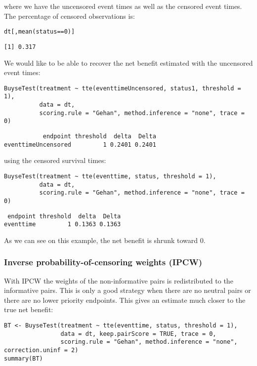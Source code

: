 \documentclass[12pt]{article}
\begin{document}
where we have the uncensored event times as well as the censored event
times. The percentage of censored observations is:
\lstset{language=r,label= ,caption= ,captionpos=b,numbers=none}
\begin{lstlisting}
dt[,mean(status==0)]
\end{lstlisting}

\begin{verbatim}
[1] 0.317
\end{verbatim}

We would like to be able to recover the net benefit estimated with the uncensored event times:
\lstset{language=r,label= ,caption= ,captionpos=b,numbers=none}
\begin{lstlisting}
BuyseTest(treatment ~ tte(eventtimeUncensored, status1, threshold = 1),
		  data = dt,
		  scoring.rule = "Gehan", method.inference = "none", trace = 0)
\end{lstlisting}

\begin{verbatim}
           endpoint threshold  delta  Delta
eventtimeUncensored         1 0.2401 0.2401
\end{verbatim}

using the censored survival times:
\lstset{language=r,label= ,caption= ,captionpos=b,numbers=none}
\begin{lstlisting}
BuyseTest(treatment ~ tte(eventtime, status, threshold = 1),
		  data = dt,
		  scoring.rule = "Gehan", method.inference = "none", trace = 0)
\end{lstlisting}

\begin{verbatim}
 endpoint threshold  delta  Delta
eventtime         1 0.1363 0.1363
\end{verbatim}

As we can see on this example, the net benefit is shrunk toward 0.

\subsubsection{Inverse probability-of-censoring weights (IPCW)}
\label{sec:org6e0a164}

With IPCW the weights of the non-informative pairs is redistributed to
the informative pairs. This is only a good strategy when there are no
neutral pairs or there are no lower priority endpoints. This gives an
estimate much closer to the true net benefit:
\lstset{language=r,label= ,caption= ,captionpos=b,numbers=none}
\begin{lstlisting}
BT <- BuyseTest(treatment ~ tte(eventtime, status, threshold = 1),
				data = dt, keep.pairScore = TRUE, trace = 0,
				scoring.rule = "Gehan", method.inference = "none", correction.uninf = 2)
summary(BT)
\end{lstlisting}
\end{document}

